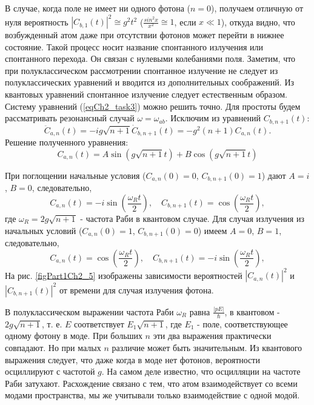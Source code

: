 В случае, когда поле не имеет ни одного фотона  ($n = 0$),
получаем отличную от нуля вероятность 
$\left|C_{b, 1}\left(t\right)\right|^2 \cong g^2 t^2$
($\frac{sin^2 x}{x^2} \cong 1$,  если
$x \ll 1$), откуда видно, что возбужденный атом даже при
отсутствии фотонов может перейти в нижнее состояние. Такой процесс
носит название спонтанного излучения или спонтанного перехода. Он
связан с нулевыми колебаниями поля. Заметим, что при полуклассическом
рассмотрении спонтанное излучение не следует из полуклассических
уравнений и вводится из дополнительных соображений. Из квантовых
уравнений спонтанное излучение следует естественным образом. 
Систему уравнений (\ref{eqCh2_task3}) можно решить точно. Для простоты
будем рассматривать резонансный случай $\omega = \omega_{ab}$.
Исключим из уравнений $C_{b, n + 1}\left(t\right)$:   
\[
{\ddot C}_{a,n}\left(t\right) = -i g \sqrt{n + 1}
{\dot C}_{b, n + 1}\left(t\right) = -g^2 \left(n + 1\right)
C_{a,n}\left(t\right). 
\]
Решение полученного уравнения:
\begin{equation}
C_{a,n}\left(t\right) = A \sin\left(g \sqrt{n + 1} t\right) +
B \cos\left(g \sqrt{n + 1} t\right)
\nonumber
\end{equation}

При поглощении начальные условия ($C_{a,n}\left(0\right) = 0$, $C_{b,n+1}\left(0\right)
= 1$) дают $A = i$, $B = 0$, следовательно,  
\begin{equation}
C_{a,n}\left(t\right) = -i \sin\left(\frac{\omega_R t}{2}\right), \quad
C_{b, n + 1}\left(t\right) = \cos\left(\frac{\omega_R t}{2}\right),
\label{eqPart1RabiAbsorbtion}
\end{equation}
где $\omega_R = 2g\sqrt{n + 1}$ - частота Раби в квантовом случае. Для случая
излучения из начальных условий ($C_{a,n}\left(0\right) = 1$,
$C_{b,n+1}\left(0\right) = 0$) имеем $A = 0$, $B = 1$, следовательно, 
\begin{equation}
C_{a,n}\left(t\right) = \cos\left(\frac{\omega_R t}{2}\right), \quad
C_{b, n + 1}\left(t\right) = -i \sin\left(\frac{\omega_R t}{2}\right),
\label{eqPart1RabiEmission}
\end{equation}
На рис. \ref{figPart1Ch2_5} изображены зависимости вероятностей 
$\left|C_{a,n}\left(t\right)\right|^2$ и 
$\left|C_{b, n + 1}\left(t\right)\right|^2$  от времени для случая
излучения фотона.



В полуклассическом выражении частота Раби $\omega_R$ равна 
$\frac{\left|p E\right|}{\hbar}$,  в квантовом - $2g\sqrt{n + 1}$,
т. е. $E$  соответствует $E_1\sqrt{n + 1}$,  где $E_1$ - поле,
соответствующее одному фотону в моде. При больших $n$ эти два
выражения практически совпадают. Но при малых $n$ различие может быть 
значительным. Из квантового  выражения следует, что даже когда в моде
нет фотонов, вероятности осциллируют с частотой  $g$.  На самом деле 
известно, что осцилляции на частоте Раби затухают. Расхождение связано
с тем, что атом взаимодействует со всеми модами пространства, мы же
учитывали только взаимодействие с одной модой.  

